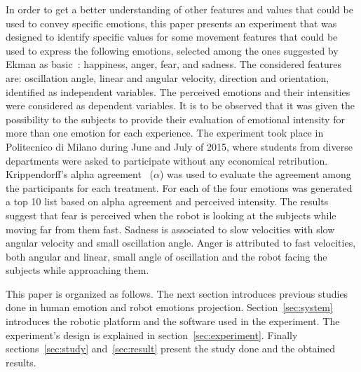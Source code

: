In order to get a better understanding of other features and values that could be used to convey specific emotions, this paper presents an experiment that was designed to identify specific values for some movement features that could be used to express the following emotions, selected among the ones suggested by Ekman as basic~\cite{Ekman2004}: happiness, anger, fear, and sadness. The considered features are: oscillation angle, linear and angular velocity, direction and orientation, identified as independent variables. The perceived emotions and their intensities were considered as dependent variables. It is to be observed that it was given the possibility to the subjects to provide their evaluation of emotional intensity for more than one emotion for each experience. The experiment took place in Politecnico di Milano during June and July of 2015, where students from diverse departments were asked to participate without any economical retribution. Krippendorff's alpha agreement~\cite{Krippendorff2007} ($\alpha$) was used to evaluate the agreement among the participants for each treatment. For each of the four emotions was generated a top 10 list based on alpha agreement and perceived intensity. The results suggest that fear is perceived when the robot is looking at the subjects while moving far from them fast. Sadness is associated to slow velocities with slow angular velocity and small oscillation angle. Anger is attributed to fast velocities, both angular and linear, small angle of oscillation and the robot facing the subjects while approaching them.

This paper is organized as follows. The next section introduces previous studies done in human emotion and robot emotions projection. Section~\ref{sec:system} introduces the robotic platform and the software used in the experiment. The experiment's design is explained in section~\ref{sec:experiment}. Finally sections~\ref{sec:study} and~\ref{sec:result} present the study done and the obtained results.